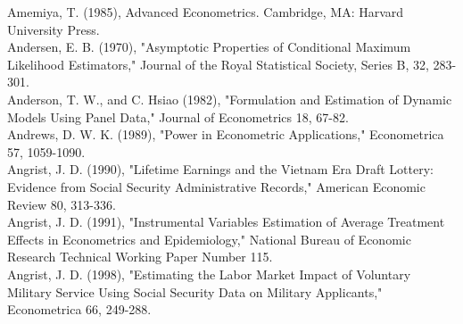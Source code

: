 \documentclass[10pt]{article}
\begin{document}
Amemiya, T. (1985), Advanced Econometrics. Cambridge, MA: Harvard University Press.\\
Andersen, E. B. (1970), "Asymptotic Properties of Conditional Maximum Likelihood Estimators," Journal of the Royal Statistical Society, Series B, 32, 283-301.\\
Anderson, T. W., and C. Hsiao (1982), "Formulation and Estimation of Dynamic Models Using Panel Data," Journal of Econometrics 18, 67-82.\\
Andrews, D. W. K. (1989), "Power in Econometric Applications," Econometrica 57, 1059-1090.\\
Angrist, J. D. (1990), "Lifetime Earnings and the Vietnam Era Draft Lottery: Evidence from Social Security Administrative Records," American Economic Review 80, 313-336.\\
Angrist, J. D. (1991), "Instrumental Variables Estimation of Average Treatment Effects in Econometrics and Epidemiology," National Bureau of Economic Research Technical Working Paper Number 115.\\
Angrist, J. D. (1998), "Estimating the Labor Market Impact of Voluntary Military Service Using Social Security Data on Military Applicants," Econometrica 66, 249-288.
\end{document}
